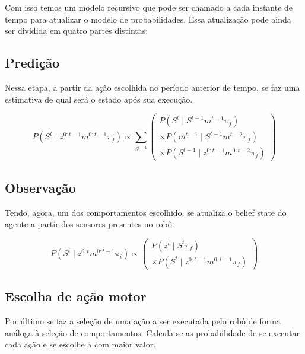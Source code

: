 Com isso temos um modelo recursivo que pode ser chamado a cada instante de tempo para atualizar o modelo de probabilidades. Essa atualização pode ainda ser dividida em quatro partes distintas:

\subsection{Predição}

Nessa etapa, a partir da ação escolhida no período anterior de tempo, se faz uma estimativa de qual será o estado após sua execução.

\begin{equation}
    P \left( S^t \mid z^{0: t-1} m^{0: t-1} \pi_f \right) \propto \sum\limits_{S^{t-1}}
        \left(
            \begin{array}{l}
                P \left( S^t \mid S^{t-1} m^{t-1} \pi_f \right) \\
                \times P \left( m^{t-1} \mid S^{t-1} m^{t-2} \pi_f \right)\\
                \times P \left( S^{t-1} \mid z^{0: t-1} m^{0: t-2} \pi_f \right)
            \end{array}
        \right)
\end{equation}


\subsection{Observação}

Tendo, agora, um dos comportamentos escolhido, se atualiza o belief state do agente a partir dos sensores presentes no robô.

\begin{equation}
    P \left( S^t \mid z^{0: t} m^{0: t-1} \pi_i \right) \propto 
        \left(
            \begin{array}{l}
                P \left( z^t \mid S^t \pi_f \right) \\
                \times P \left( S^t \mid z^{0: t-1} m^{0: t-1} \pi_f \right)
            \end{array}
        \right)
\end{equation}


\subsection{Escolha de ação motor}

Por último se faz a seleção de uma ação a ser executada pelo robô de forma análoga à seleção de comportamentos. Calcula-se as probabilidade de se executar cada ação  e se escolhe a com maior valor.


